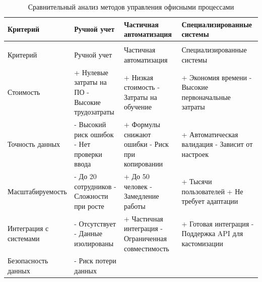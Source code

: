 \begingroup
\singlespacing
\vspace{-\baselineskip}
\begin{longtable}{| >{\raggedright}m{} 
                  | >{\raggedright}m{} 
                  | >{\raggedright}m{} 
                  | >{\raggedright\arraybackslash}m{}|}
    \caption{Сравнительный анализ методов управления офисными процессами} \label{table:office-management-methods-comparison} \\ \hline
    Критерий & Ручной учет & Частичная автоматизация & Специали\-зи\-ро\-ван\-ные системы \\ \hline
    \endfirsthead
    \multicolumn{4}{@{}l}{\noindent Продолжение таблицы~\thetable} \\ \hline
    Критерий & Ручной учет & Частичная автоматизация & Специали\-зи\-ро\-ван\-ные системы \\ \hline
    \endhead
    Стоимость & 
    + Нулевые затраты на ПО\newline
    - Высокие трудозатраты & 
    + Низкая стоимость\newline
    - Затраты на обучение & 
    + Экономия времени\newline
    - Высокие первоначальные затраты \\
    \hline
    Точность данных & 
    - Высокий риск ошибок\newline
    - Нет проверки ввода & 
    + Формулы снижают ошибки\newline
    - Риск при копировании & 
    + Автоматическая валидация\newline
    - Зависит от настроек \\
    \hline
    Масшта\-би\-ру\-емость & 
    - До 20 сотрудников\newline
    - Сложности при росте & 
    + До 50 человек\newline
    - Замедление работы & 
    + Тысячи пользователей\newline
    + Не требует адаптации \\
    \hline
    Интеграция с системами & 
    - Отсутствует\newline
    - Данные изолированы & 
    + Частичная интеграция\newline
    - Ограниченная совместимость & 
    + Готовая интеграция\newline
    - Поддержка API для кастомизации \\
    \hline
    Безо\-пас\-ность данных & 
    - Риск потери данных\newline

\end{longtable}
